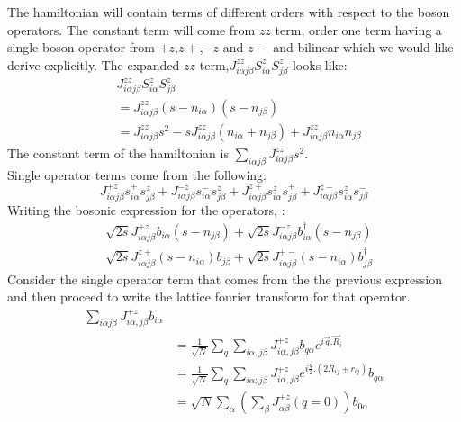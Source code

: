 The hamiltonian will contain terms of different orders with respect to the boson operators. The constant term will come from $ zz $ term, order one term having a single boson operator from $ +z $,$ z+ $,$ -z $ and $ z- $ and bilinear which we would like derive explicitly. The expanded $ zz $ term,$ J^{zz}_{i\alpha j\beta}S^z_{i\alpha}S^z_{j\beta} $ looks like:
\begin{equation}\label{eq36}
\begin{split}
&J^{zz}_{i\alpha j\beta}S^z_{i\alpha}S^z_{j\beta} \\
&= J^{zz}_{i\alpha j\beta}(s - n_{i\alpha})( s - n_{j\beta} )\\
&=J^{zz}_{i\alpha j\beta}s^2 - sJ^{zz}_{i\alpha j\beta}(n_{i\alpha} + n_{j\beta}) + J^{zz}_{i\alpha j\beta}n_{i\alpha}n_{j\beta}
\end{split}
\end{equation}
The constant term of the hamiltonian is $ \sum_{i\alpha j\beta}^{}J^{zz}_{i\alpha j\beta}s^2 $.\\
Single operator terms come from the following:
\begin{equation}\label{eq37}
J^{+z}_{i\alpha j\beta}s^{+}_{i\alpha}s^{z}_{j\beta} + J^{-z}_{i\alpha j\beta}s^{-}_{i\alpha}s^{z}_{j\beta} + J^{z+}_{i\alpha j\beta}s^{z}_{i\alpha}s^{+}_{j\beta} + J^{z-}_{i\alpha j\beta}s^{z}_{i\alpha}s^{-}_{j\beta}
\end{equation}
Writing the bosonic expression for the operators, :
\begin{equation}\label{eq38}
\begin{split}			
&\sqrt{2s}J^{+z}_{i\alpha j\beta}b_{i\alpha}(s-n_{j\beta}) + \sqrt{2s}J^{-z}_{i\alpha j\beta}b_{i\alpha}^\dagger(s - n_{j\beta})\\
&\sqrt{2s}J^{z+}_{i\alpha j\beta}(s - n_{i\alpha})b_{j\beta} + \sqrt{2s}J^{+-}_{i\alpha j\beta}(s - n_{i\alpha})b_{j\beta}^\dagger
\end{split}
\end{equation}
Consider the single operator term that comes from the the previous expression and then proceed to write the lattice fourier transform for that operator.
\begin{equation}\label{eq39}
\begin{split}
\sum_{i\alpha j\beta}^{}J^{+z}_{i\alpha,j\beta}b_{i\alpha}&\\
& = \frac{1}{\sqrt{N}} \sum_{q}^{}\sum_{i\alpha,j\beta}^{}J^{+z}_{i\alpha,j\beta}b_{q\alpha}e^{i\vec{q}.\vec{R}_i}\\
& = \frac{1}{\sqrt{N}}\sum_{q}^{}\sum_{i\alpha;j\beta}^{}J^{+z}_{i\alpha,j\beta}e^{i\frac{q}{2}.(2R_{ij} + r_{ij})}b_{q\alpha}\\
& = \sqrt{N}\sum_{\alpha}^{}(\sum_{\beta}^{}J^{+z}_{\alpha \beta}(q=0))b_{0\alpha}
\end{split}
\end{equation}
